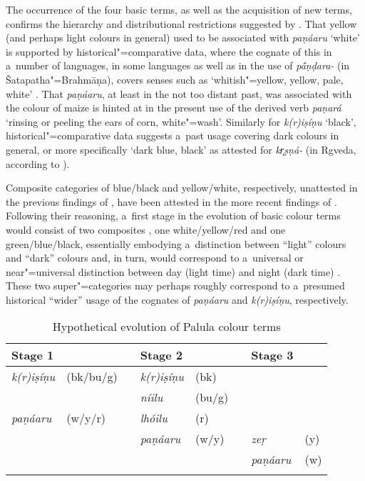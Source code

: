 The occurrence of the four basic terms, as well as the acquisition of new terms, confirms the hierarchy and distributional restrictions suggested by \citet[2--5]{berlinkay1969}. That yellow (and perhaps light colours in general) used to be associated with \textit{paṇáaru} `white' is supported by historical"=comparative data, where the cognate of this in a~number of  languages, in some  languages as well as in the  use of \textit{p\'{\={a}}ṇḍara-} (in Šatapatha"=Brahmāṇa), covers senses such as `whitish"=yellow, yellow, pale, white' \citep[8047]{turner1966}. That \textit{paṇáaru}, at least in the not too distant past, was associated with the colour of maize is hinted at in the present use of the derived verb \textit{paṇará} `rinsing or peeling the ears of corn, white"=wash'. Similarly for \textit{k(r)iṣíṇu} `black', historical"=comparative data suggests a~past usage covering dark colours in general, or more specifically `dark blue, black' as attested for  \textit{kr̥ṣṇá-} (in Rgveda, according to \citealt[3451]{turner1966}). 



Composite categories of blue/black and yellow/white, respectively, unattested in the previous findings of \citet{berlinkay1969}, have been attested in the more recent findings of \citet[17]{kayetal1991}. Following their reasoning, a~first stage in the evolution of basic colour terms would consist of two composites \citep[19]{kayetal1991}, one white/yellow/red and one green/blue/black, essentially embodying a~distinction between ``light'' colours and ``dark'' colours and, in turn, would correspond to a~universal or near"=universal distinction between day (light time) and night (dark time) \citep[288]{wierzbicka1996}. These two super"=categories may perhaps roughly correspond to a~presumed historical ``wider'' usage of the cognates of \textit{paṇáaru} and \textit{k(r)iṣíṇu}, respectively. 



\begin{table}[ht]
\caption{Hypothetical evolution of Palula colour terms}
\begin{tabularx}{\textwidth}{ Q Q l Q Q l Q Q }
\lsptoprule
Stage 1 &
&
&
Stage 2 &
&
&
Stage 3 &
\\\hline
\textit{k(r)iṣíṇu} &
(bk/bu/g) &
 &
\textit{k(r)iṣíṇu} &
(bk) &
&
&
\\
&
&
 &
\textit{níilu} &
(bu/g) &
&
&
\\
\textit{paṇáaru} &
(w/y/r) &
&
\textit{lhóilu} &
(r) &
&
&
\\
&
&
&
\textit{paṇáaru} &
(w/y) &
&
\textit{zeṛ} &
(y)\\
&
&
&
&
&
&
\textit{paṇáaru} &
(w)\\\lspbottomrule
\end{tabularx}
\label{tab:6-1}
\end{table}


